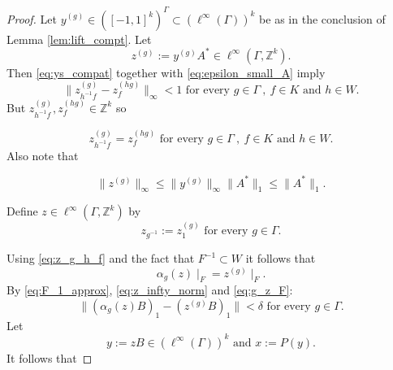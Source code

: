 \documentclass[oneside,english]{amsart}
\theoremstyle{definition}
\newcommand{\ZZ}{\mathbb{Z}}
\begin{document}
\begin{proof}
Let   $y^{(g)} \in ([-1,1]^k)^\Gamma \subset (\ell^\infty(\Gamma))^k$ be as in the conclusion of  Lemma \ref{lem:lift_compt}.
Let
\begin{equation}
z^{(g)}:= y^{(g)}A^* \in \ell^\infty(\Gamma,\mathbb{Z}^k).
\end{equation}
Then \eqref{eq:ys_compat} together with \eqref{eq:epsilon_small_A} imply
\begin{equation}\label{eq:z_approx}
\|z^{(g)}_{h^{-1}f} - z^{(hg)}_f\|_\infty <1 \mbox{ for every } g \in \Gamma~,~  f \in K \mbox{ and } h \in W.
\end{equation}
But $z^{(g)}_{h^{-1}f} ,z^{(hg)}_f \in\ZZ^k$ so

\begin{equation}\label{eq:z_g_h_f}
z^{(g)}_{h^{-1}f} =  z^{(hg)}_f \mbox{ for every } g \in \Gamma~,~  f \in K \mbox{ and } h \in W.
\end{equation}
Also note that

\begin{equation}\label{eq:z_infty_norm}
\|z^{(g)}\|_\infty \le \|y^{(g)}\|_\infty \|A^*\|_1 \le \|A^*\|_1.
\end{equation}

Define $z \in  \ell^\infty(\Gamma,\mathbb{Z}^k)$ by
\begin{equation}\label{eq:z_def}
z_{g^{-1}} := z^{(g)}_1 \mbox{ for every } g\in \Gamma.
\end{equation}

Using \eqref{eq:z_g_h_f} and the fact that $F^{-1} \subset W$ it follows that
\begin{equation}\label{eq:g_z_F}
 \alpha_g(z)\mid_F = z^{(g)}\mid_F.
\end{equation}
By \eqref{eq:F_1_approx}, \eqref{eq:z_infty_norm} and \eqref{eq:g_z_F}:
\begin{equation}\label{eq:z_B_trace}
 \| (\alpha_g (z) B)_1 - (z^{(g)} B)_1 \| < \delta \mbox{ for every } g \in \Gamma.
\end{equation}
Let
\begin{equation}
y:=  z B \in (\ell^\infty(\Gamma))^k \mbox{ and } x:= P(y).
\end{equation}
It follows that


\end{proof}
\end{document}
